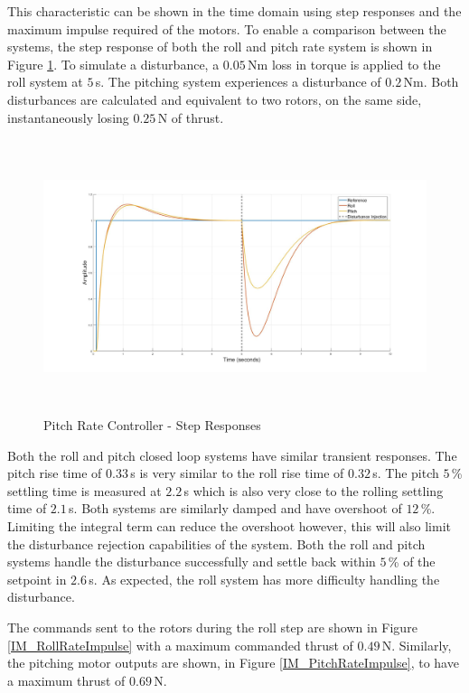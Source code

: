 \documentclass[12pt]{report}
\begin{document}
This characteristic can be shown in the time domain using step responses and the maximum impulse required of the motors. To enable a comparison between the systems, the step response of both the roll and pitch rate system is shown in Figure \ref{IM_PitchRateStep}. To simulate a disturbance, a $0.05$\,Nm loss in torque is applied to the roll system at $5$\,s. The pitching system experiences a disturbance of $0.2$\,Nm. Both disturbances are calculated and equivalent to two rotors, on the same side, instantaneously losing $0.25$\,N of thrust.

\begin{figure}[H]
	\centering
	\includegraphics[height = 8cm]{../Design/Matlab/Controllers/roll_pitch_rate_step.jpg}
	\caption{Pitch Rate Controller -  Step Responses}
	\label{IM_PitchRateStep}
\end{figure}

Both the roll and pitch closed loop systems have similar transient responses. The pitch rise time of $0.33$\,s is very similar to the roll rise time of $0.32$\,s. The pitch $5$\,\% settling time is measured at $2.2$\,s which is also very close to the rolling settling time of $2.1$\,s. Both systems are similarly damped and have overshoot of $12$\,\%. Limiting the integral term can reduce the overshoot however, this will also limit the disturbance rejection capabilities of the system. Both the roll and pitch systems handle the disturbance successfully and settle back within $5$\,\% of the setpoint in $2.6$\,s. As expected, the roll system has more difficulty handling the disturbance.

The commands sent to the rotors during the roll step are shown in Figure \ref{IM_RollRateImpulse} with a maximum commanded thrust of $0.49$\,N. Similarly, the pitching motor outputs are shown, in Figure \ref{IM_PitchRateImpulse}, to have a maximum thrust of $0.69$\,N.
\end{document}
